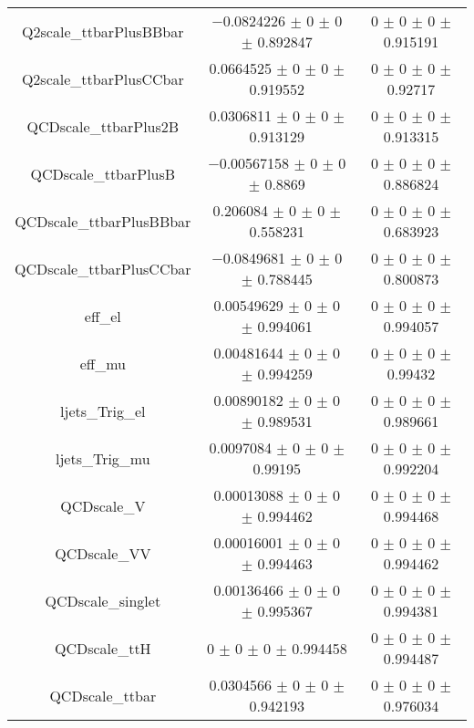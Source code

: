 \begin{table}
\begin{tabular}{ccc}
Q2scale\_ttbarPlusBBbar & \num{-0.0824226} $\pm$ \num{0} $\pm$ \num{0} $\pm$ \num{0.892847} & \num{0} $\pm$ \num{0} $\pm$ \num{0} $\pm$ \num{0.915191}\\
Q2scale\_ttbarPlusCCbar & \num{0.0664525} $\pm$ \num{0} $\pm$ \num{0} $\pm$ \num{0.919552} & \num{0} $\pm$ \num{0} $\pm$ \num{0} $\pm$ \num{0.92717}\\
QCDscale\_ttbarPlus2B & \num{0.0306811} $\pm$ \num{0} $\pm$ \num{0} $\pm$ \num{0.913129} & \num{0} $\pm$ \num{0} $\pm$ \num{0} $\pm$ \num{0.913315}\\
QCDscale\_ttbarPlusB & \num{-0.00567158} $\pm$ \num{0} $\pm$ \num{0} $\pm$ \num{0.8869} & \num{0} $\pm$ \num{0} $\pm$ \num{0} $\pm$ \num{0.886824}\\
QCDscale\_ttbarPlusBBbar & \num{0.206084} $\pm$ \num{0} $\pm$ \num{0} $\pm$ \num{0.558231} & \num{0} $\pm$ \num{0} $\pm$ \num{0} $\pm$ \num{0.683923}\\
QCDscale\_ttbarPlusCCbar & \num{-0.0849681} $\pm$ \num{0} $\pm$ \num{0} $\pm$ \num{0.788445} & \num{0} $\pm$ \num{0} $\pm$ \num{0} $\pm$ \num{0.800873}\\
eff\_el & \num{0.00549629} $\pm$ \num{0} $\pm$ \num{0} $\pm$ \num{0.994061} & \num{0} $\pm$ \num{0} $\pm$ \num{0} $\pm$ \num{0.994057}\\
eff\_mu & \num{0.00481644} $\pm$ \num{0} $\pm$ \num{0} $\pm$ \num{0.994259} & \num{0} $\pm$ \num{0} $\pm$ \num{0} $\pm$ \num{0.99432}\\
ljets\_Trig\_el & \num{0.00890182} $\pm$ \num{0} $\pm$ \num{0} $\pm$ \num{0.989531} & \num{0} $\pm$ \num{0} $\pm$ \num{0} $\pm$ \num{0.989661}\\
ljets\_Trig\_mu & \num{0.0097084} $\pm$ \num{0} $\pm$ \num{0} $\pm$ \num{0.99195} & \num{0} $\pm$ \num{0} $\pm$ \num{0} $\pm$ \num{0.992204}\\
QCDscale\_V & \num{0.00013088} $\pm$ \num{0} $\pm$ \num{0} $\pm$ \num{0.994462} & \num{0} $\pm$ \num{0} $\pm$ \num{0} $\pm$ \num{0.994468}\\
QCDscale\_VV & \num{0.00016001} $\pm$ \num{0} $\pm$ \num{0} $\pm$ \num{0.994463} & \num{0} $\pm$ \num{0} $\pm$ \num{0} $\pm$ \num{0.994462}\\
QCDscale\_singlet & \num{0.00136466} $\pm$ \num{0} $\pm$ \num{0} $\pm$ \num{0.995367} & \num{0} $\pm$ \num{0} $\pm$ \num{0} $\pm$ \num{0.994381}\\
QCDscale\_ttH & \num{0} $\pm$ \num{0} $\pm$ \num{0} $\pm$ \num{0.994458} & \num{0} $\pm$ \num{0} $\pm$ \num{0} $\pm$ \num{0.994487}\\
QCDscale\_ttbar & \num{0.0304566} $\pm$ \num{0} $\pm$ \num{0} $\pm$ \num{0.942193} & \num{0} $\pm$ \num{0} $\pm$ \num{0} $\pm$ \num{0.976034}\\

\end{tabular}
\end{table}
